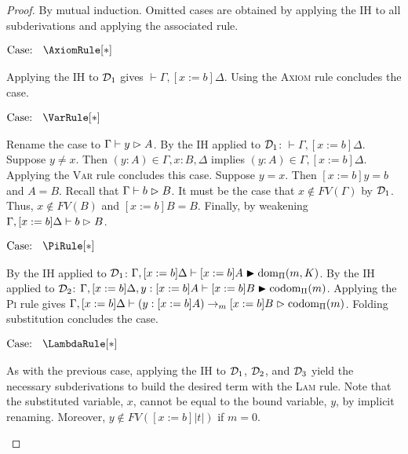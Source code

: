 \begin{proof}
    By mutual induction.
    Omitted cases are obtained by applying the IH to all subderivations and applying the associated rule.

    $\text{Case: }\begin{array}{c} \AxiomRule[*] \end{array}$
    \begin{proofcase}
        Applying the IH to $\mathcal{D}_{1}$ gives $\vdash \Gamma, [x := b]\Delta$.
        Using the \textsc{Axiom} rule concludes the case.
    \end{proofcase}

    $\text{Case: }\begin{array}{c} \VarRule[*] \end{array}$
    \begin{proofcase}
        Rename the case to $\Gamma \vdash y \vartriangleright A$.
        By the IH applied to $\mathcal{D}_{1}$: $\vdash \Gamma, [x := b]\Delta$.
        Suppose $y \neq x$.
        Then $(y : A) \in \Gamma, x : B, \Delta$ implies $(y : A) \in \Gamma, [x := b]\Delta$.
        Applying the \textsc{Var} rule concludes this case.
        Suppose $y = x$.
        Then $[x := b]y = b$ and $A = B$.
        Recall that $\Gamma \vdash b \vartriangleright B$.
        It must be the case that $x \notin FV(\Gamma)$ by $\mathcal{D}_{1}$.
        Thus, $x \notin FV(B)$ and $[x := b]B = B$.
        Finally, by weakening $\Gamma, [x := b]\Delta \vdash b \vartriangleright B$.
    \end{proofcase}

    $\text{Case: }\begin{array}{c} \PiRule[*] \end{array}$
    \begin{proofcase}
        By the IH applied to $\mathcal{D}_{1}$: $\Gamma, [x := b]\Delta \vdash [x := b]A \blacktriangleright \mbox{\normalfont dom}_\Pi(m, K)$.
        By the IH applied to $\mathcal{D}_{2}$: $\Gamma, [x := b]\Delta, y : [x := b]A \vdash [x := b]B \blacktriangleright \mbox{\normalfont codom}_\Pi(m)$.
        Applying the \textsc{Pi} rule gives $\Gamma, [x := b]\Delta \vdash (y : [x := b]A) \to_m [x := b]B \vartriangleright \mbox{\normalfont codom}_\Pi(m)$.
        Folding substitution concludes the case.
    \end{proofcase}

    $\text{Case: }\begin{array}{c} \LambdaRule[*] \end{array}$
    \begin{proofcase}
        As with the previous case, applying the IH to $\mathcal{D}_{1}$, $\mathcal{D}_{2}$, and $\mathcal{D}_{3}$ yield the necessary subderivations to build the desired term with the \textsc{Lam} rule.
        Note that the substituted variable, $x$, cannot be equal to the bound variable, $y$, by implicit renaming.
        Moreover, $y \notin FV([x := b]|t|)$ if $m = 0$.
    \end{proofcase}


\end{proof}

